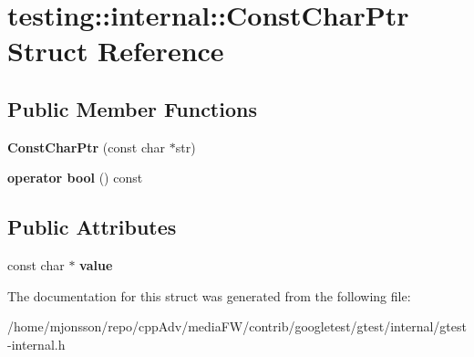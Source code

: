 \hypertarget{structtesting_1_1internal_1_1ConstCharPtr}{}\section{testing\+:\+:internal\+:\+:Const\+Char\+Ptr Struct Reference}
\label{structtesting_1_1internal_1_1ConstCharPtr}
\subsection*{Public Member Functions}
\begin{DoxyCompactItemize}
\item 
\mbox{\label{structtesting_1_1internal_1_1ConstCharPtr_ae94f6453fa679d815994eccc63062907}} 
{\bfseries Const\+Char\+Ptr} (const char $\ast$str)
\item 
\mbox{\label{structtesting_1_1internal_1_1ConstCharPtr_a85c8174b5d4db8fe96863509ba767b27}} 
{\bfseries operator bool} () const
\end{DoxyCompactItemize}
\subsection*{Public Attributes}
\begin{DoxyCompactItemize}
\item 
\mbox{\label{structtesting_1_1internal_1_1ConstCharPtr_adba40d23d5986904b605946f643cf26e}} 
const char $\ast$ {\bfseries value}
\end{DoxyCompactItemize}


The documentation for this struct was generated from the following file\+:\begin{DoxyCompactItemize}
\item 
/home/mjonsson/repo/cpp\+Adv/media\+F\+W/contrib/googletest/gtest/internal/gtest-\/internal.\+h\end{DoxyCompactItemize}
